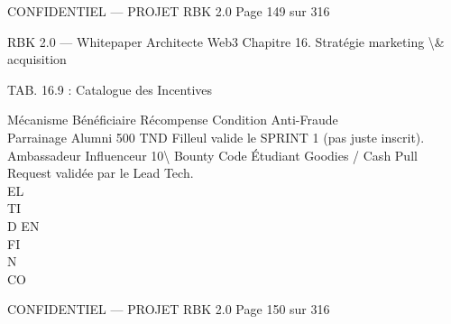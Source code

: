 \vspace{0.5em}
\vspace{0.5em}
\vspace{0.5em}
\vspace{0.5em}
\begin{confidential}CONFIDENTIEL — PROJET RBK 2.0                                  Page 149 sur 316\end{confidential}
RBK 2.0 — Whitepaper Architecte Web3                                                           Chapitre 16. Stratégie marketing \textbackslash{}& acquisition\\
\vspace{0.5em}
\vspace{0.5em}
\begin{center}\begin{tabular}TAB. 16.9 : Catalogue des Incentives\end{tabular}\end{center}
\vspace{0.5em}
\vspace{0.5em}
Mécanisme Bénéficiaire Récompense      Condition Anti-Fraude\\
Parrainage  Alumni      500 TND        Filleul valide le SPRINT 1 (pas juste inscrit).\\
Ambassadeur Influenceur 10\textbackslash{}%
Bounty Code Étudiant    Goodies / Cash Pull Request validée par le Lead Tech.\\
\vspace{0.5em}
\vspace{0.5em}
\vspace{0.5em}
\vspace{0.5em}
EL\\
TI\\
D    EN\\
FI\\
N\\
CO\\
\vspace{0.5em}
\vspace{0.5em}
\vspace{0.5em}
\vspace{0.5em}
\begin{confidential}CONFIDENTIEL — PROJET RBK 2.0                                Page 150 sur 316\end{confidential}
